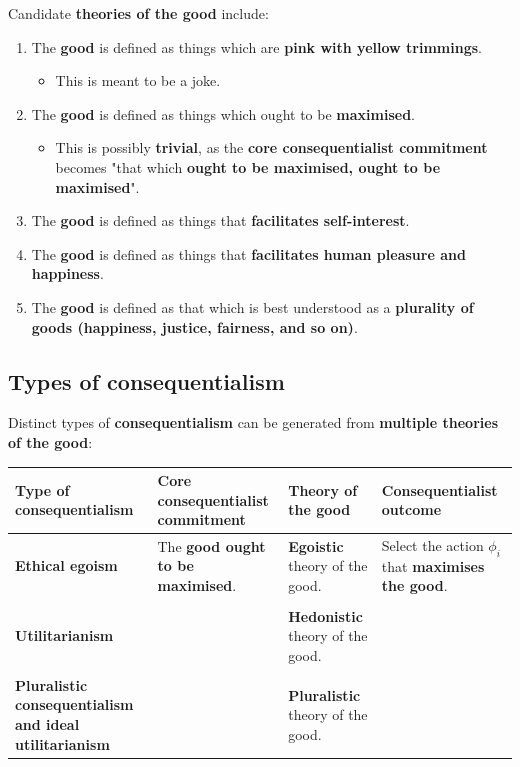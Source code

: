\documentclass[11pt]{article}
\begin{document}
Candidate \textbf{theories of the good} include:
\begin{enumerate}
\item The \textbf{good} is defined as things which are \textbf{pink with yellow trimmings}.
\begin{itemize}
\item This is meant to be a joke.
\end{itemize}
\item The \textbf{good} is defined as things which ought to be \textbf{maximised}.
\begin{itemize}
\item This is possibly \textbf{trivial}, as the \textbf{core consequentialist commitment} becomes "that which \textbf{ought to be maximised, ought to be maximised}".
\end{itemize}
\item The \textbf{good} is defined as things that \textbf{facilitates self-interest}.
\item The \textbf{good} is defined as things that \textbf{facilitates human pleasure and happiness}.
\item The \textbf{good} is defined as that which is best understood as a \textbf{plurality of goods (happiness, justice, fairness, and so on)}.
\end{enumerate}

 \newpage
\subsection{Types of consequentialism}
\label{sec:org9cc6b52}
Distinct types of \textbf{consequentialism} can be generated from \textbf{multiple theories of the good}:
\begin{center}
\begin{tabularx}{\textwidth}{|X|X|X|X|}
\hline
Type of consequentialism & Core consequentialist commitment & Theory of the good & Consequentialist outcome\\
\hline
\textbf{Ethical egoism} & The \textbf{good ought to be maximised}. & \textbf{Egoistic} theory of the good. & Select the action \(\phi_i\) that \textbf{maximises the good}.\\
 &  &  & \\
\textbf{Utilitarianism} &  & \textbf{Hedonistic} theory of the good. & \\
 &  &  & \\
\textbf{Pluralistic consequentialism and ideal utilitarianism} &  & \textbf{Pluralistic} theory of the good. & \\
\hline
\end{tabularx}
\end{center}
\end{document}
